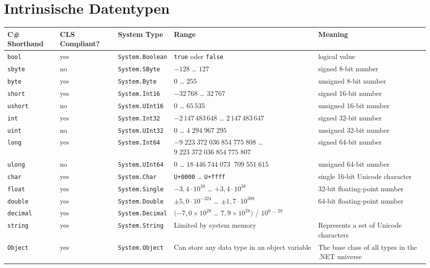 \section{Intrinsische Datentypen}
{\begin{otherlanguage}{english}\footnotesize%
\begin{longtable}{L{.12} L{.125} L{.18} L{.28} L{.25}}
C\# Shorthand & CLS \newline Compliant? & System Type & Range & Meaning \\\hline
\lstinline$bool$ & yes & \lstinline$System.Boolean$ & \lstinline$true$ oder \lstinline$false$ & logical value \\
\lstinline$sbyte$ & no & \lstinline$System.SByte$ & $-128$ … $127$ & signed 8-bit number \\
\lstinline$byte$ & yes & \lstinline$System.Byte$ & $0$ … $255$ & unsigned 8-bit number \\
\lstinline$short$ & yes & \lstinline$System.Int16$ & $-32\,768$ … $32\,767$ & signed 16-bit number \\
\lstinline$ushort$ & no & \lstinline$System.UInt16$ & $0$ … $65\,535$ & unsigned 16-bit number \\
\lstinline$int$ & yes & \lstinline$System.Int32$ & $-2\,147\,483\,648$ … $2\,147\,483\,647$ & signed 32-bit number \\
\lstinline$uint$ & no & \lstinline$System.UInt32$ & $0$ … $4\;294\;967\;295$ & unsigned 32-bit number \\
\lstinline$long$ & yes & \lstinline$System.Int64$ & $-9\;223\;372\;036\;854\;775\;808$ … $9\;223\;372\;036\;854\;775\;807$ & signed 64-bit number \\
\lstinline$ulong$ & no & \lstinline$System.UInt64$ & $0$ … $18\;446\;744\;073\;\;709\;551\;615$ & unsigned 64-bit number \\
\lstinline$char$ & yes & \lstinline$System.Char$ & \lstinline$U+0000$ … \lstinline$U+ffff$ & single 16-bit Unicode character \\
\lstinline$float$ & yes & \lstinline$System.Single$ & $-3,4\cdot 10^{38}$ … $+3,4 \cdot 10^{38}$ & 32-bit floating-point number \\
\lstinline$double$ & yes & \lstinline$System.Double$ & $\pm 5,0 \cdot 10^{-324}$ … $\pm 1,7 \cdot 10^{308}$ & 64-bit floating-point number \\
\lstinline$decimal$ & yes & \lstinline$System.Decimal$ & $(-7,0 \times 10^{28}$ … $7,9\times 10^{28})$ / $10^{0 \text{ … }28}$ & \\
\lstinline$string$ & yes & \lstinline$System.String$ & Limited by system memory & Represents a set of Unicode characters \\
\lstinline$Object$ & yes & \lstinline$System.Object$ & Can store any data type in an object variable & The base class of all types in the .NET universe \\
\end{longtable}
\end{otherlanguage}}
